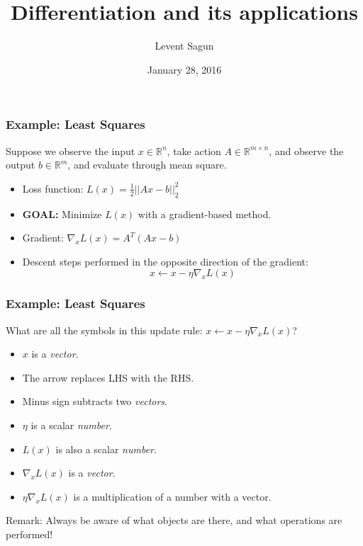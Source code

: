 \documentclass{beamer}
\title{Differentiation and its applications}
\author{Levent Sagun}
\institute{New York University}
\date{January 28, 2016}
\begin{document}

\frame{\titlepage}


\begin{frame}
\frametitle{Example: Least Squares}
Suppose we observe the input $x\in \mathbb{R}^n$, take action $A\in \mathbb{R}^{m \times n}$, and observe the output $b\in \mathbb{R}^m$, and evaluate through mean square.

\begin{itemize}
    \item<1-> Loss function: $L(x) = \frac{1}{2}||Ax-b||_2^2 $
    \item<1-> \textbf{GOAL:} Minimize $L(x)$ with a gradient-based method.
    \item<2-> Gradient: $\nabla_xL(x) = A^T(Ax-b)$ 
    \item<2-> Descent steps performed in the opposite direction of the gradient: \[x \leftarrow x - \eta \nabla_xL(x)\]
\end{itemize}
\end{frame}


\begin{frame}
\frametitle{Example: Least Squares}
What are all the symbols in this update rule: $x \leftarrow x - \eta \nabla_xL(x)$?
\begin{itemize}
    \item<2-> $x$ is a \textit{vector}.
    \item<2-> The arrow replaces LHS with the RHS.
    \item<2-> Minus sign subtracts two \textit{vectors}.
    \item<2-> $\eta$ is a scalar \textit{number}.
    \item<2-> $L(x)$ is also a scalar \textit{number}.
    \item<2-> $\nabla_xL(x)$ is a \textit{vector}.
    \item<2-> $\eta \nabla_xL(x)$ is a multiplication of a number with a vector.
\end{itemize}
\begin{block}{}
Remark: Always be aware of what objects are there, and what operations are performed!
\end{block}
\end{frame}

\end{document}
